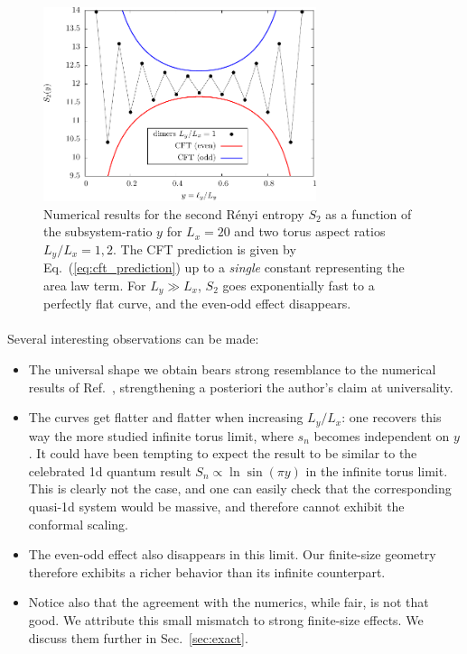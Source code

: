 \documentclass[11pt]{iopart}
\begin{document}
\begin{figure}[ht]
\begin{center}
 \includegraphics[width=8cm]{./figures/dimers_shape.pdf}
 \end{center}
 \caption{Numerical results for the second R\'enyi entropy $S_2$ as a function of the subsystem-ratio $y$ for $L_x=20$ and two torus aspect ratios $L_y/L_x=1,2$. The CFT prediction is given by Eq.~(\ref{eq:cft_prediction}) up to a \emph{single} constant representing the area law term. For $L_y\gg L_x$, $S_2$ goes exponentially fast to a perfectly flat curve, and the even-odd effect disappears.}
 \label{fig:dimers_shape}
\end{figure}
\paragraph{}
Several interesting observations can be made:
\begin{itemize}
 \item The universal shape we obtain bears strong resemblance to the numerical results of Ref.~\cite{Ju2012}, strengthening a posteriori the author's claim at universality.  
 \item The curves get flatter and flatter when increasing $L_y/L_x$: one recovers this way the more studied infinite torus limit, where $s_n$ becomes independent on $y$. It could have been tempting to expect the result to be similar to the celebrated 1d quantum result\cite{CC} $S_n\propto \ln\sin (\pi y)$ in the infinite torus limit. This is clearly not the case, and one can easily check that the corresponding quasi-1d system would be massive, and therefore cannot exhibit the conformal scaling. 
 \item The even-odd effect also disappears in this limit. Our finite-size geometry therefore exhibits a richer behavior than its infinite counterpart.
 \item Notice also that the agreement with the numerics, while fair, is not that good. We attribute this small mismatch to strong finite-size effects. We discuss them further in Sec.~\ref{sec:exact}.
\end{itemize}
\end{document}
